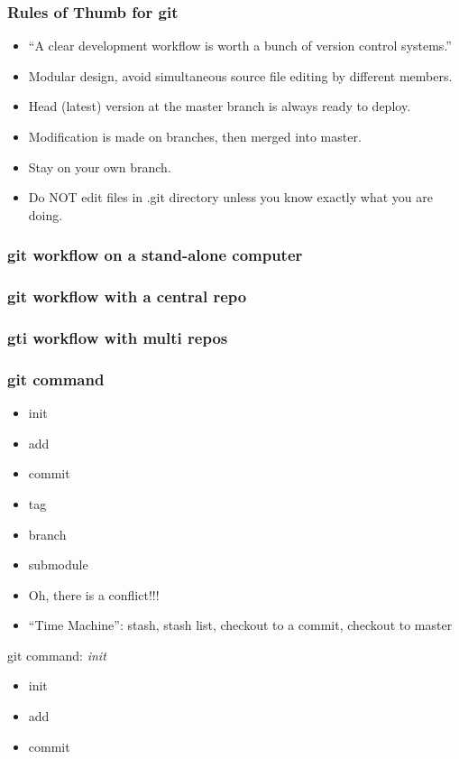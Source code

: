 \documentclass[14pt,ignorenonframetext,]{beamer}
\begin{document}
\begin{frame}\frametitle{Rules of Thumb for git}

\begin{itemize}
\item
  ``A clear development workflow is worth a bunch of version control
  systems.''
\item
  Modular design, avoid simultaneous source file editing by different
  members.
\item
  Head (latest) version at the master branch is always ready to deploy.
\item
  Modification is made on branches, then merged into master.
\item
  Stay on your own branch.
\item
  Do NOT edit files in .git directory unless you know exactly what you
  are doing.
\end{itemize}
\end{frame}

\begin{frame}\frametitle{git workflow on a stand-alone computer}

\end{frame}

\begin{frame}\frametitle{git workflow with a central repo}

\end{frame}

\begin{frame}\frametitle{gti workflow with multi repos}

\end{frame}

\begin{frame}\frametitle{git command}

\begin{itemize}
\item
  init
\item
  add
\item
  commit
\item
  tag
\item
  branch
\item
  submodule
\item
  Oh, there is a conflict!!!
\item
  ``Time Machine'': stash, stash list, checkout to a commit, checkout to
  master
\end{itemize}
\begin{block}{git command: \emph{init}}

\begin{itemize}
\item
  init
\item
  add
\item
  commit
\end{itemize}
\end{block}

\end{frame}
\end{document}

